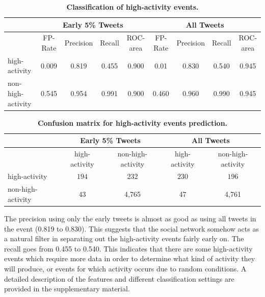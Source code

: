 \documentclass[10pt,letterpaper]{article}
\newcommand{\inblue}[1]{{\color{MyBlue}\sf\textbf{\textsc{#1}}}}
\newcommand{\supplementary}[0]{\inblue{[Supplementary Material]}}
\begin{document}
\begin{table}[!htb]
  \centering
  {\small
    \begin{tabularx}{\textwidth}{lcccc|cccc}
      \toprule
      & \multicolumn{4}{c}{\textbf{Early 5\% Tweets}} & \multicolumn{4}{c}{\textbf{All Tweets}} \\
      \midrule
      & FP-Rate & Precision & Recall & ROC-area & FP-Rate & Precision & Recall & ROC-area \\
      high-activity & 0.009 & 0.819 & 0.455 & 0.900 & 0.01 & 0.830 & 0.540 & 0.945 \\
      non-high-activity & 0.545 & 0.954 & 0.991 & 0.900 &  0.460 & 0.960 & 0.990 & 0.945 \\
      \bottomrule
    \end{tabularx}
  }
  \caption{\textbf{Classification of high-activity events.}}
  \label{tab:classification_results}
\end{table}

\begin{table}[!htb]
  \centering
  \begin{tabularx}{\textwidth}{lcc|cc}
    \toprule
    \multirow{2}{*}{ }& \multicolumn{2}{c}{\textbf{Early 5\% Tweets}} & \multicolumn{2}{c}{\textbf{All Tweets}} \\
    \midrule
    & high-activity & non-high-activity & high-activity & non-high-activity \\
    high-activity & $194$ & $232$ & $230$ & $196$\\
    non-high-activity & $43$ & 4,765 & 47 & 4,761 \\
    \bottomrule
  \end{tabularx}
  \caption{\textbf{Confusion matrix for high-activity events prediction.}}
  \label{tab:confusion_matrix}
\end{table}



The precision using only the early tweets is almost as good as using
all tweets in the event (0.819 to 0.830). This suggests that the
social network somehow acts as a natural filter in separating out the
high-activity events fairly early on.  The recall goes from 0.455 to
0.540. This indicates that there are some high-activity events which
require more data in order to determine what kind of activity they will
produce, or events for which activity occurs due to random conditions. A
detailed description of the features and different classification
settings are provided in the supplementary material.%
\end{document}
